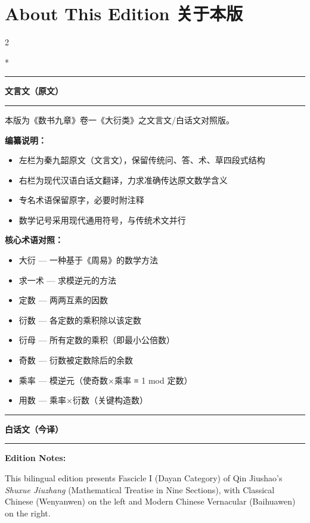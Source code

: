 \documentclass[11pt,a4paper]{article}
\newcommand{\zhtext}[1]{{\chinese #1}}
\newcommand{\leftcolheader}{%
  \noindent\textcolor{leftheader}{\rule{\columnwidth}{1.5pt}}\par
  \vspace{2pt}
  \noindent\textbf{\color{leftheader}\chinese 文言文（原文）}\par
  \vspace{2pt}
  \noindent\textcolor{leftheader}{\rule{\columnwidth}{0.6pt}}\par
  \vspace{4pt}
}
\newcommand{\rightcolheader}{%
  \noindent\textcolor{rightheader}{\rule{\columnwidth}{1.5pt}}\par
  \vspace{2pt}
  \noindent\textbf{\color{rightheader}\chinese 白话文（今译）}\par
  \vspace{2pt}
  \noindent\textcolor{rightheader}{\rule{\columnwidth}{0.6pt}}\par
  \vspace{4pt}
}
\begin{document}
\newpage

\section*{About This Edition \zhtext{关于本版}}

\begin{paracol}{2}

\switchcolumn[0]*\leftcolheader

\small
本版为《数书九章》卷一《大衍类》之文言文/白话文对照版。

\textbf{编纂说明：}
\begin{itemize}[topsep=0pt,parsep=0pt]
  \item 左栏为秦九韶原文（文言文），保留传统\zhtext{问、答、术、草}四段式结构
  \item 右栏为现代汉语白话文翻译，力求准确传达原文数学含义
  \item 专名术语保留原字，必要时附注释
  \item 数学记号采用现代通用符号，与传统术文并行
\end{itemize}

\textbf{核心术语对照：}
\begin{itemize}[topsep=0pt,parsep=0pt]
  \item 大衍 --- 一种基于《周易》的数学方法
  \item 求一术 --- 求模逆元的方法
  \item 定数 --- 两两互素的因数
  \item 衍数 --- 各定数的乘积除以该定数
  \item 衍母 --- 所有定数的乘积（即最小公倍数）
  \item 奇数 --- 衍数被定数除后的余数
  \item 乘率 --- 模逆元（使奇数×乘率 ≡ 1 mod 定数）
  \item 用数 --- 乘率×衍数（关键构造数）
\end{itemize}

\switchcolumn\rightcolheader

\small\color{prefacecolor}
\textbf{Edition Notes:}

This bilingual edition presents Fascicle I (Dayan Category) of Qin Jiushao's \textit{Shuxue Jiuzhang} (Mathematical Treatise in Nine Sections), with Classical Chinese (Wenyanwen) on the left and Modern Chinese Vernacular (Baihuawen) on the right.


\end{paracol}
\end{document}
